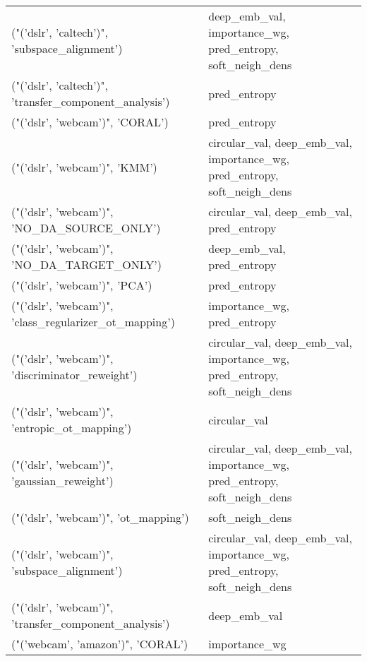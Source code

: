 \begin{tabular}{ll}
 ("('dslr', 'caltech')", 'subspace\_alignment')             & deep\_emb\_val, importance\_wg, pred\_entropy, soft\_neigh\_dens               \\
 ("('dslr', 'caltech')", 'transfer\_component\_analysis')    & pred\_entropy                                                             \\
 ("('dslr', 'webcam')", 'CORAL')                           & pred\_entropy                                                             \\
 ("('dslr', 'webcam')", 'KMM')                             & circular\_val, deep\_emb\_val, importance\_wg, pred\_entropy, soft\_neigh\_dens \\
 ("('dslr', 'webcam')", 'NO\_DA\_SOURCE\_ONLY')               & circular\_val, deep\_emb\_val, pred\_entropy                                 \\
 ("('dslr', 'webcam')", 'NO\_DA\_TARGET\_ONLY')               & deep\_emb\_val, pred\_entropy                                               \\
 ("('dslr', 'webcam')", 'PCA')                             & pred\_entropy                                                             \\
 ("('dslr', 'webcam')", 'class\_regularizer\_ot\_mapping')    & importance\_wg, pred\_entropy                                              \\
 ("('dslr', 'webcam')", 'discriminator\_reweight')          & circular\_val, deep\_emb\_val, importance\_wg, pred\_entropy, soft\_neigh\_dens \\
 ("('dslr', 'webcam')", 'entropic\_ot\_mapping')             & circular\_val                                                             \\
 ("('dslr', 'webcam')", 'gaussian\_reweight')               & circular\_val, deep\_emb\_val, importance\_wg, pred\_entropy, soft\_neigh\_dens \\
 ("('dslr', 'webcam')", 'ot\_mapping')                      & soft\_neigh\_dens                                                          \\
 ("('dslr', 'webcam')", 'subspace\_alignment')              & circular\_val, deep\_emb\_val, importance\_wg, pred\_entropy, soft\_neigh\_dens \\
 ("('dslr', 'webcam')", 'transfer\_component\_analysis')     & deep\_emb\_val                                                             \\
 ("('webcam', 'amazon')", 'CORAL')                         & importance\_wg                                                            \\

\end{tabular}
